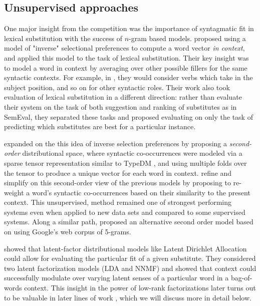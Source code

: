\subsection{Unsupervised approaches}

One major insight from the competition was the importance of syntagmatic fit in
lexical substitution with the success of $n$-gram based models.
 proposed using a model of "inverse" selectional
preferences to compute a word vector {\em in context}, and applied this model
to the task of lexical substitution. Their key insight was to model a word in
context by averaging over other possible fillers for the same syntactic
contexts. For example, in , they would consider
verbs which take  in the subject position, and so on for other
syntactic roles. Their work also took evaluation of lexical substitution in a
different direction: rather than evaluate their system on the task of both
suggestion and ranking of substitutes as in SemEval, they separated these tasks
and proposed evaluating on only the task of predicting which substitutes are
best for a particular instance.

 expanded on the this idea of inverse
selection preferences by proposing a {\em second-order} distributional space,
where syntactic co-occurrences were modeled via a sparse tensor representation
similar to TypeDM \cite{baroni:2011:gems}, and using multiple folds over the
tensor to produce a unique vector for each word in context.
 refine and simplify on this second-order view of
the previous models by proposing to re-weight a word's syntactic co-occurrences
based on their similarity to the present context.
This unsupervised, method remained one of strongest performing systems even when
applied to new data sets \cite{kremer:2014:eacl} and compared to some
supervised systems. Along a similar path,  proposed
an alternative second order model based on using Google's web corpus of
5-grams.

 showed that latent-factor distributional models like
Latent Dirichlet Allocation \cite{blei:2003:jmlr} could allow for evaluating
the particular fit of a given substitute. They considered two latent
factorization models (LDA and NNMF) and showed that context could successfully
modulate over varying latent senses of a particular word in a bag-of-words
context. This insight in the power of low-rank factorizations later turns
out to be valuable in later lines of work
\cite{melamud:2015:vsm,roller:2016:naacl}, which we will discuss more in detail
below.

